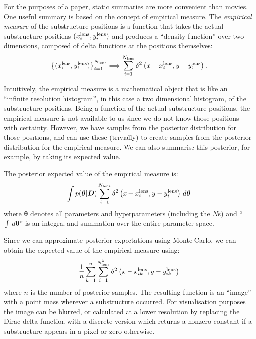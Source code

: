 \documentclass[useAMS,usenatbib]{mn2e}
\newcommand{\revisions}{\color{blue}}
\begin{document}
For the purposes of a paper, static summaries are more convenient than movies.
One useful summary is based on the concept of empirical measure.
The {\it empirical measure} of the substructure positions is a function that
takes the actual substructure positions $(x_i^{\rm lens}, y_i^{\rm lens})$ and
produces a ``density function'' over two dimensions, composed of delta
functions at the positions themselves:
\begin{eqnarray}
\left\{
(x_i^{\rm lens}, y_i^{\rm lens})
\right\}_{i=1}^{N_{\rm lens}}
\Longrightarrow
\sum_{i=1}^{N_{\rm lens}}
\delta^2\left(x - x_i^{\rm lens}, y - y_i^{\rm lens}\right).
\end{eqnarray}

Intuitively, the empirical measure is a mathematical object that is like
an ``infinite resolution histogram'', in this case a two dimensional histogram,
of the substructure positions.
Being a function of the actual substructure positions, the empirical measure
is not available to us since we do not know those positions with certainty.
However, we have samples from the posterior distribution for those positions,
and can use these (trivially) to create samples from the posterior distribution
for the empirical measure. We can also summarise this posterior, for example,
by taking its expected value.

The posterior expected value of the empirical measure is:
{\revisions
\begin{eqnarray}
\int p(\boldsymbol{\theta} | \boldsymbol{D})
\sum_{i=1}^{N_{\rm lens}}
\delta^2\left(x - x_i^{\rm lens}, y - y_i^{\rm lens}\right)
\, d\boldsymbol{\theta}
\end{eqnarray}
}
where $\boldsymbol{\theta}$ denotes all parameters and hyperparameters
(including the $N$s) and ``$\int \,d\boldsymbol{\theta}$'' is an integral and summation over the entire parameter space.

Since we can approximate posterior expectations using Monte Carlo, we can
obtain the expected value of the empirical measure using:
{\revisions
\begin{eqnarray}
\frac{1}{n}
\sum_{k=1}^n
\sum_{i=1}^{N_{\rm lens}^k}
\delta^2\left(x - x_{ik}^{\rm lens}, y - y_{ik}^{\rm lens}\right)
\end{eqnarray}
}
where $n$ is the number of posterior samples. The resulting function is
an ``image'' with a point mass wherever a substructure occurred. For
visualisation purposes the image can be blurred, or calculated at a lower
resolution by replacing the Dirac-delta function with a discrete version
which returns a nonzero constant
if a substructure appears in a pixel or zero otherwise.
\end{document}
